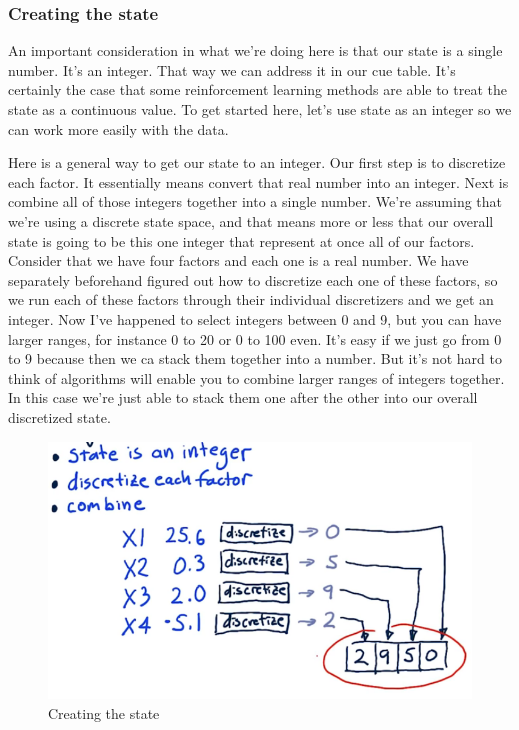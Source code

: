 \documentclass[12pt]{article}
\begin{document}
\subsubsection{Creating the state}

An important consideration in what we're doing here is that our state is a single number. It's an integer. That way we can address it in our cue table. It's certainly the case that some reinforcement learning methods are able to treat the state as a continuous value. To get started here, let's use state as an integer so we can work more easily with the data. 

Here is a general way to get our state to an integer. Our first step is to discretize each factor. It essentially means convert that real number into an integer. Next is combine all of those integers together into a single number. We're assuming that we're using a discrete state space, and that means more or less that our overall state is going to be this one integer that represent at once all of our factors. Consider that we have four factors and each one is a real number. We have separately beforehand figured out how to discretize each one of these factors, so we run each of these factors through their individual discretizers and we get an integer. Now I've happened to select integers between 0 and 9, but you can have larger ranges, for instance 0 to 20 or 0 to 100 even. It's easy if we just go from 0 to 9 because then we ca stack them together into a number. But it's not hard to think of algorithms will enable you to combine larger ranges of integers together. In this case we're just able to stack them one after the other into our overall discretized state. 

\begin{figure}[!ht]
\centering
\includegraphics[scale=0.45]{fig/fig111}
\caption{Creating the state}
\end{figure}
\end{document}
